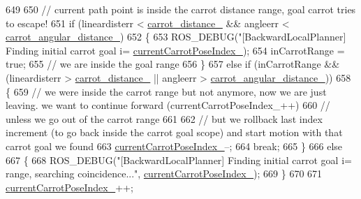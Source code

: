 \begin{DoxyCode}
{649 
650                 \textcolor{comment}{// current path point is inside the carrot distance range, goal carrot tries to escape!}
651                 \textcolor{keywordflow}{if} (lineardisterr < \hyperlink{classcl__move__base__z_1_1backward__local__planner_1_1BackwardLocalPlanner_a0bbb80ce5bae865c4322869422803296}{carrot\_distance\_} && angleerr < 
      \hyperlink{classcl__move__base__z_1_1backward__local__planner_1_1BackwardLocalPlanner_a63e30befa09c4a67cf55086923b760c7}{carrot\_angular\_distance\_})
652                 \{
653                     ROS\_DEBUG(\textcolor{stringliteral}{"[BackwardLocalPlanner] Finding initial carrot goal i=%
      \hyperlink{classcl__move__base__z_1_1backward__local__planner_1_1BackwardLocalPlanner_a2e8f2b78bc97f27c5fa431f3af2261ed}{currentCarrotPoseIndex\_});
654                     inCarrotRange = \textcolor{keyword}{true};
655                     \textcolor{comment}{// we are inside the goal range}
656                 \}
657                 \textcolor{keywordflow}{else} \textcolor{keywordflow}{if} (inCarrotRange && (lineardisterr > \hyperlink{classcl__move__base__z_1_1backward__local__planner_1_1BackwardLocalPlanner_a0bbb80ce5bae865c4322869422803296}{carrot\_distance\_} || angleerr > 
      \hyperlink{classcl__move__base__z_1_1backward__local__planner_1_1BackwardLocalPlanner_a63e30befa09c4a67cf55086923b760c7}{carrot\_angular\_distance\_}))
658                 \{
659                     \textcolor{comment}{// we were inside the carrot range but not anymore, now we are just leaving. we want to
       continue forward (currentCarrotPoseIndex\_++)}
660                     \textcolor{comment}{// unless we go out of the carrot range}
661 
662                     \textcolor{comment}{// but we rollback last index increment (to go back inside the carrot goal scope) and
       start motion with that carrot goal we found}
663                     \hyperlink{classcl__move__base__z_1_1backward__local__planner_1_1BackwardLocalPlanner_a2e8f2b78bc97f27c5fa431f3af2261ed}{currentCarrotPoseIndex\_}--;
664                     \textcolor{keywordflow}{break};
665                 \}
666                 \textcolor{keywordflow}{else}
667                 \{
668                     ROS\_DEBUG(\textcolor{stringliteral}{"[BackwardLocalPlanner] Finding initial carrot goal i=%
       range, searching coincidence..."}, \hyperlink{classcl__move__base__z_1_1backward__local__planner_1_1BackwardLocalPlanner_a2e8f2b78bc97f27c5fa431f3af2261ed}{currentCarrotPoseIndex\_});
669                 \}
670 
671                 \hyperlink{classcl__move__base__z_1_1backward__local__planner_1_1BackwardLocalPlanner_a2e8f2b78bc97f27c5fa431f3af2261ed}{currentCarrotPoseIndex\_}++;
}}
\end{DoxyCode}
